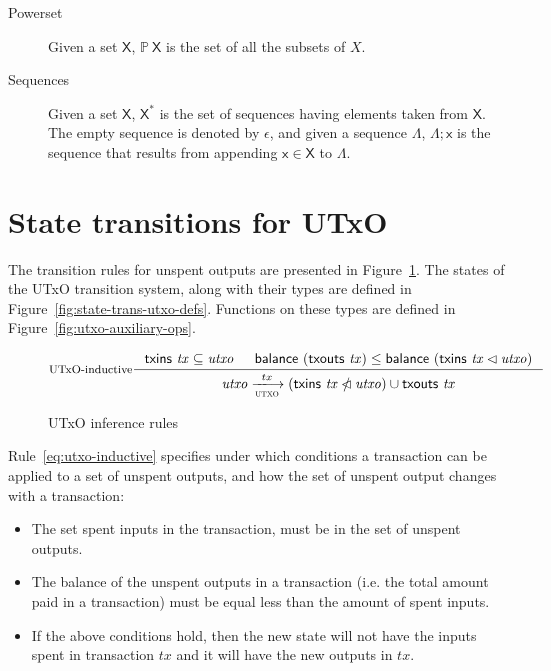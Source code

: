 \documentclass[11pt,a4paper]{article}
\newcommand{\powerset}[1]{\mathbb{P}~#1}
\newcommand{\restrictdom}{\lhd}
\newcommand{\subtractdom}{\mathbin{\slashed{\restrictdom}}}
\newcommand{\var}[1]{\mathit{#1}}
\newcommand{\fun}[1]{\mathsf{#1}}
\newcommand{\type}[1]{\mathsf{#1}}
\newcommand{\trans}[2]{\xlongrightarrow[\textsc{#1}]{#2}}
\newcommand{\seqof}[1]{#1^{*}}
\newcommand{\txins}[1]{\fun{txins}~ \var{#1}}
\newcommand{\txouts}[1]{\fun{txouts}~ \var{#1}}
\newcommand{\balance}[1]{\fun{balance}~ \var{#1}}
\begin{document}
\begin{description}
\item[Powerset] Given a set $\type{X}$, $\powerset{\type{X}}$ is the set of all
  the subsets of $X$.
\item[Sequences] Given a set $\type{X}$, $\seqof{\type{X}}$ is the set of
  sequences having elements taken from $\type{X}$. The empty sequence is
  denoted by $\epsilon$, and given a sequence $\Lambda$, $\Lambda; \type{x}$ is
  the sequence that results from appending $\type{x} \in \type{X}$ to
  $\Lambda$.
\end{description}

\section{State transitions for UTxO}
\label{sec:state-trans-utxo-1}

The transition rules for unspent outputs are presented in
Figure~\ref{fig:state-trans-utxo}. The states of the UTxO transition system,
along with their types are defined in Figure~\ref{fig:state-trans-utxo-defs}.
Functions on these types are defined in Figure~\ref{fig:utxo-auxiliary-ops}.

\begin{figure}
  \begin{equation}\label{eq:utxo-inductive}
    \inference[UTxO-inductive]
    { \txins{tx} \subseteq \var{utxo}
      & \balance{(\txouts{tx})} \leq \balance{(\txins{tx} \restrictdom \var{utxo})}
    }
    {\var{utxo} \trans{utxo}{tx}
      (\txins{tx} \subtractdom \var{utxo}) \cup \txouts{tx}
    }
  \end{equation}
  \caption{UTxO inference rules}
  \label{fig:state-trans-utxo}
\end{figure}

Rule~\ref{eq:utxo-inductive} specifies under which conditions a transaction can
be applied to a set of unspent outputs, and how the set of unspent output
changes with a transaction:
\begin{itemize}
\item The set spent inputs in the transaction, must be in the set of unspent
  outputs.
\item The balance of the unspent outputs in a transaction (i.e. the total
  amount paid in a transaction) must be equal less than the amount of spent
  inputs.
\item If the above conditions hold, then the new state will not have the inputs
  spent in transaction $\var{tx}$ and it will have the new outputs in
  $\var{tx}$.
\end{itemize}
\end{document}
